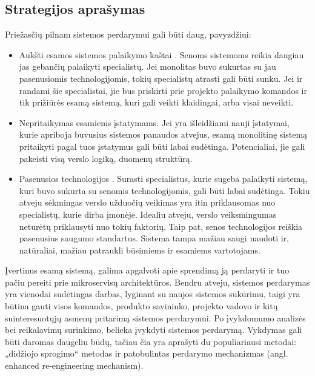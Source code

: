 \documentclass{VUMIFPSbakalaurinis}
\begin{document}
\subsection{Strategijos aprašymas}
Priežasčių pilnam sistemos perdarymui gali būti daug, pavyzdžiui:
\begin{itemize}
    \item Aukšti esamos sistemos palaikymo kaštai \cite{Gli21}. Senoms sistemoms reikia daugiau jas gebančių palaikyti specialistų. Jei monolitas buvo sukurtas su jau pasenusiomis technologijomis, tokių specialistų atrasti gali būti sunku. Jei ir randami šie specialistai, jie bus priskirti prie projekto palaikymo komandos ir tik prižiūrės esamą sistemą, kuri gali veikti klaidingai, arba visai neveikti.
    
    \item Nepritaikymas esamiems įstatymams. Jei yra išleidžiami nauji įstatymai, kurie apriboja buvusius sistemos panaudos atvejus, esamą monolitinę sistemą pritaikyti pagal tuos įstatymus gali būti labai sudėtinga. Potencialiai, jie gali pakeisti visą verslo logiką, duomenų struktūrą.
    
    \item Pasenusios technologijos \cite{MQO18}. Surasti specialistus, kurie sugeba palaikyti sistemą, kuri buvo sukurta su senomis technologijomis, gali būti labai sudėtinga. Tokiu atveju sėkmingas verslo užduočių veikimas  yra itin priklausomas nuo specialistų, kurie dirba įmonėje. Idealiu atveju, verslo veiksmingumas neturėtų priklausyti nuo tokių faktorių. Taip pat, senos technologijos reiškia pasenusius saugumo standartus. Sistema tampa mažiau saugi naudoti ir, natūraliai, mažiau patraukli būsimiems ir esamiems vartotojams.\\
\end{itemize}

Įvertinus esamą sistemą, galima apgalvoti apie sprendimą ją perdaryti ir tuo pačiu pereiti prie mikroservisų architektūros. Bendru atveju, sistemos perdarymas yra vienodai sudėtingas darbas, lyginant su naujos sistemos sukūrimu, taigi yra būtina gauti visos komandos, produkto savininko, projekto vadovo ir kitų suinteresuotųjų asmenų pritarimą sistemos perdarymui. Po įvykdomumo analizės bei reikalavimų surinkimo, belieka įvykdyti sistemos perdarymą. Vykdymas gali būti daromas daugeliu būdų, tačiau čia yra aprašyti du populiariausi metodai: „didžiojo sprogimo“ \cite{Ngu11} metodas ir patobulintas perdarymo mechanizmas \cite{MQO18} (angl. enhanced re-engineering mechanism).
\end{document}
